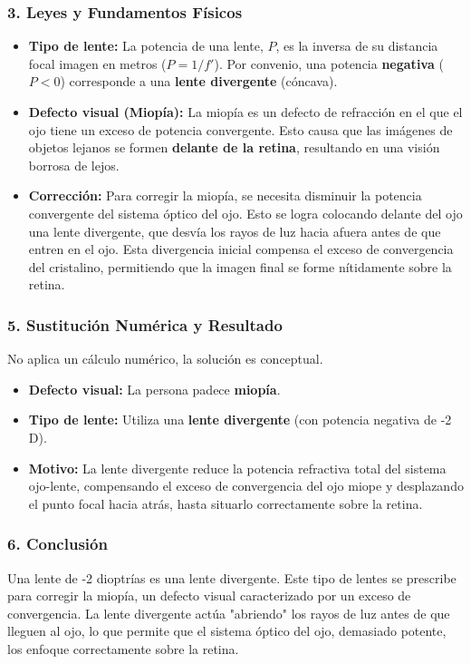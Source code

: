 \subsubsection*{3. Leyes y Fundamentos Físicos}
\begin{itemize}
    \item \textbf{Tipo de lente:} La potencia de una lente, $P$, es la inversa de su distancia focal imagen en metros ($P=1/f'$). Por convenio, una potencia \textbf{negativa} ($P < 0$) corresponde a una \textbf{lente divergente} (cóncava).
    \item \textbf{Defecto visual (Miopía):} La miopía es un defecto de refracción en el que el ojo tiene un exceso de potencia convergente. Esto causa que las imágenes de objetos lejanos se formen \textbf{delante de la retina}, resultando en una visión borrosa de lejos.
    \item \textbf{Corrección:} Para corregir la miopía, se necesita disminuir la potencia convergente del sistema óptico del ojo. Esto se logra colocando delante del ojo una lente divergente, que desvía los rayos de luz hacia afuera antes de que entren en el ojo. Esta divergencia inicial compensa el exceso de convergencia del cristalino, permitiendo que la imagen final se forme nítidamente sobre la retina.
\end{itemize}

\subsubsection*{5. Sustitución Numérica y Resultado}
No aplica un cálculo numérico, la solución es conceptual.
\begin{cajaresultado}
\begin{itemize}
    \item \textbf{Defecto visual:} La persona padece \textbf{miopía}.
    \item \textbf{Tipo de lente:} Utiliza una \textbf{lente divergente} (con potencia negativa de -2 D).
    \item \textbf{Motivo:} La lente divergente reduce la potencia refractiva total del sistema ojo-lente, compensando el exceso de convergencia del ojo miope y desplazando el punto focal hacia atrás, hasta situarlo correctamente sobre la retina.
\end{itemize}
\end{cajaresultado}

\subsubsection*{6. Conclusión}
\begin{cajaconclusion}
Una lente de -2 dioptrías es una lente divergente. Este tipo de lentes se prescribe para corregir la miopía, un defecto visual caracterizado por un exceso de convergencia. La lente divergente actúa "abriendo" los rayos de luz antes de que lleguen al ojo, lo que permite que el sistema óptico del ojo, demasiado potente, los enfoque correctamente sobre la retina.
\end{cajaconclusion}

